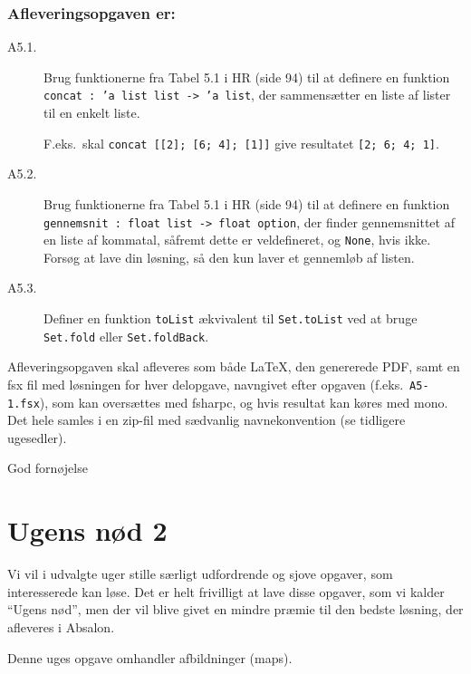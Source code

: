 \documentclass[a4paper]{article}
\begin{document}
\subsubsection*{Afleveringsopgaven er:}


\begin{description}

\item[A5.1.] Brug funktionerne fra Tabel 5.1 i HR (side 94) til at
  definere en funktion \texttt{concat : 'a list list -> 'a list}, der
  sammensætter en liste af lister til en enkelt liste.

F.eks.\ skal \texttt{concat [[2]; [6; 4]; [1]]} give resultatet
\texttt{[2; 6; 4; 1]}.

\item[A5.2.] Brug funktionerne fra Tabel 5.1 i HR (side 94) til at
  definere en funktion \texttt{gennemsnit : float list -> float
    option}, der finder gennemsnittet af en liste af kommatal, såfremt
  dette er veldefineret, og \texttt{None}, hvis ikke.  Forsøg at lave
  din løsning, så den kun laver et gennemløb af listen.

\item[A5.3.] Definer en funktion \texttt{toList} ækvivalent til
  \texttt{Set.toList} ved at bruge \texttt{Set.fold} eller
  \texttt{Set.foldBack}.

\end{description}

\noindent
Afleveringsopgaven skal afleveres som både \LaTeX, den genererede PDF,
samt en fsx fil med løsningen for hver delopgave, navngivet efter
opgaven (f.eks.\ \texttt{A5-1.fsx}), som kan oversættes med
fsharpc, og hvis resultat kan køres med mono.  Det hele samles i en
zip-fil med sædvanlig navnekonvention (se tidligere ugesedler).


\vspace{1ex}

\hfill God fornøjelse

\section*{Ugens nød 2}

Vi vil i udvalgte uger stille særligt udfordrende og sjove opgaver,
som interesserede kan løse.  Det er helt frivilligt at lave disse
opgaver, som vi kalder ``Ugens nød'', men der vil blive givet en
mindre præmie til den bedste løsning, der afleveres i Absalon.

Denne uges opgave omhandler afbildninger (maps).
\end{document}
